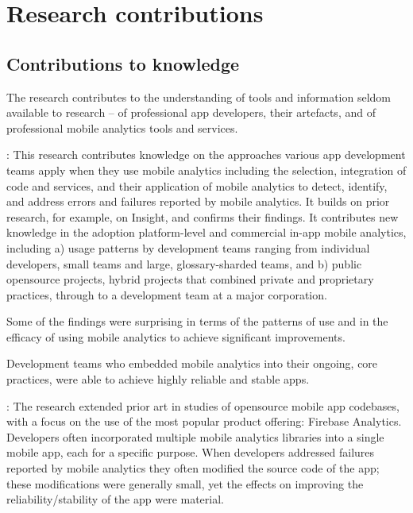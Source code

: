 \section{Research contributions}


\subsection{Contributions to knowledge}
The research contributes to the understanding of tools and information seldom available to research -- of professional app developers, their artefacts, and of professional mobile analytics tools and services. 

: 
This research contributes knowledge on the approaches various app development teams apply when they use mobile analytics including the selection, integration of code and services, and their application of mobile analytics to detect, identify, and address errors and failures reported by mobile analytics. It builds on prior research, for example, on Insight, and confirms their findings. It contributes new knowledge in the adoption platform-level and commercial in-app mobile analytics, including a) usage patterns by development teams ranging from individual  developers, small teams and large,  \gls{glossary-sharded} teams, and b) public opensource projects, hybrid projects that combined private and proprietary practices, through to a development team at a major corporation.

Some of the findings were surprising in terms of the patterns of use and in the efficacy of using mobile analytics to achieve significant improvements.

Development teams who embedded mobile analytics into their ongoing, core practices, were able to achieve highly reliable and stable apps. 

: 
The research extended prior art in studies of opensource mobile app codebases, with a focus on the use of the most popular product offering: Firebase Analytics. Developers often incorporated multiple mobile analytics libraries into a single mobile app, each for a specific purpose. When developers addressed failures reported by mobile analytics they often modified the source code of the app; these modifications were generally small, yet the effects on improving the reliability/stability of the app were material. 

